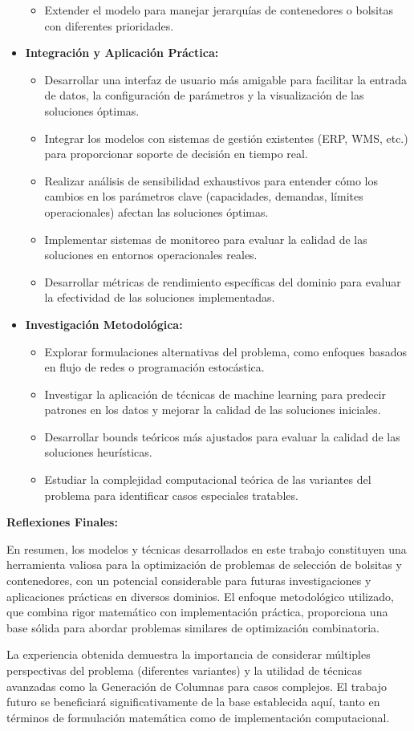 \documentclass[a4paper,12pt]{article}
\begin{document}
\begin{itemize}
\begin{itemize}
        \item Extender el modelo para manejar jerarquías de contenedores o bolsitas con diferentes prioridades.
    \end{itemize}
    \item \textbf{Integración y Aplicación Práctica:}
    \begin{itemize}
        \item Desarrollar una interfaz de usuario más amigable para facilitar la entrada de datos, la configuración de parámetros y la visualización de las soluciones óptimas.
        \item Integrar los modelos con sistemas de gestión existentes (ERP, WMS, etc.) para proporcionar soporte de decisión en tiempo real.
        \item Realizar análisis de sensibilidad exhaustivos para entender cómo los cambios en los parámetros clave (capacidades, demandas, límites operacionales) afectan las soluciones óptimas.
        \item Implementar sistemas de monitoreo para evaluar la calidad de las soluciones en entornos operacionales reales.
        \item Desarrollar métricas de rendimiento específicas del dominio para evaluar la efectividad de las soluciones implementadas.
    \end{itemize}
    \item \textbf{Investigación Metodológica:}
    \begin{itemize}
        \item Explorar formulaciones alternativas del problema, como enfoques basados en flujo de redes o programación estocástica.
        \item Investigar la aplicación de técnicas de machine learning para predecir patrones en los datos y mejorar la calidad de las soluciones iniciales.
        \item Desarrollar bounds teóricos más ajustados para evaluar la calidad de las soluciones heurísticas.
        \item Estudiar la complejidad computacional teórica de las variantes del problema para identificar casos especiales tratables.
    \end{itemize}
\end{itemize}

\textbf{Reflexiones Finales:}

En resumen, los modelos y técnicas desarrollados en este trabajo constituyen una herramienta valiosa para la optimización de problemas de selección de bolsitas y contenedores, con un potencial considerable para futuras investigaciones y aplicaciones prácticas en diversos dominios. El enfoque metodológico utilizado, que combina rigor matemático con implementación práctica, proporciona una base sólida para abordar problemas similares de optimización combinatoria.

La experiencia obtenida demuestra la importancia de considerar múltiples perspectivas del problema (diferentes variantes) y la utilidad de técnicas avanzadas como la Generación de Columnas para casos complejos. El trabajo futuro se beneficiará significativamente de la base establecida aquí, tanto en términos de formulación matemática como de implementación computacional.
\end{document}
